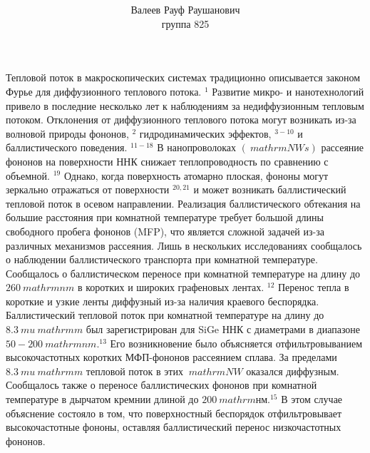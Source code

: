 \documentclass[a4paper, 12pt]{article}%
\author{Валеев Рауф Раушанович \\
группа 825}
\title{\textbf{
}}
\begin{document}
Тепловой поток в макроскопических системах традиционно описывается законом Фурье для диффузионного теплового потока. $ {} ^ {1} $ Развитие микро- и нанотехнологий привело в последние несколько лет к наблюдениям за недиффузионным тепловым потоком. Отклонения от диффузионного теплового потока могут возникать из-за волновой природы фононов, $ {} ^ {2} $ гидродинамических эффектов, $ {} ^ {3-10} $ и баллистического поведения. $ {} ^ {11-18} $ В нанопроволоках $ (\ mathrm {NWs}) $ рассеяние фононов на поверхности ННК снижает теплопроводность по сравнению с объемной. $ {} ^ {19} $ Однако, когда поверхность атомарно плоская, фононы могут зеркально отражаться от поверхности $ ^ {20,21} $ и может возникать баллистический тепловой поток в осевом направлении.
Реализация баллистического обтекания на большие расстояния при комнатной температуре требует большой длины свободного пробега фононов (MFP), что является сложной задачей из-за различных механизмов рассеяния. Лишь в нескольких исследованиях сообщалось о наблюдении баллистического транспорта при комнатной температуре. Сообщалось о баллистическом переносе при комнатной температуре на длину до $ 260 \ mathrm {nm} $ в коротких и широких графеновых лентах. $ {} ^ {12} $ Перенос тепла в короткие и узкие ленты диффузный из-за наличия краевого беспорядка. Баллистический тепловой поток при комнатной температуре на длину до $ 8.3 \ mu \ mathrm {m} $ был зарегистрирован для SiGe ННК с диаметрами в диапазоне $ 50-  200 \ mathrm {nm}. {} ^ {13} $ Его возникновение было объясняется отфильтровыванием высокочастотных коротких МФП-фононов рассеянием сплава. За пределами $ 8.3 \ mu \ mathrm {m} $ тепловой поток в этих $ \ mathrm {NW} $ оказался диффузным. Сообщалось также о переносе баллистических фононов при комнатной температуре в дырчатом кремнии длиной до $ 200 \ mathrm {нм}. {} ^ {15} $ В этом случае объяснение состояло в том, что поверхностный беспорядок отфильтровывает высокочастотные фононы, оставляя баллистический перенос низкочастотных фононов.
\end{document}
